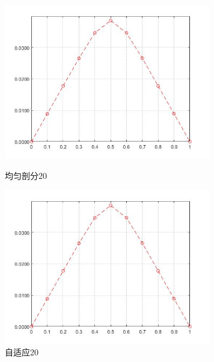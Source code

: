 \documentclass[12pt]{ctexart}
\begin{document}
\begin{figure}[H]
	\centering
	\begin{minipage}[t]{0.48\textwidth}
		\centering
		\includegraphics[width=9cm]{方程二，均匀剖分10.jpg}
		\caption{均匀剖分20}
	\end{minipage}
	\begin{minipage}[t]{0.48\textwidth}
		\centering
		\includegraphics[width=9cm]{方程二，自适应10.jpg}
		\caption{自适应20}
	\end{minipage}
\end{figure}
\end{document}
